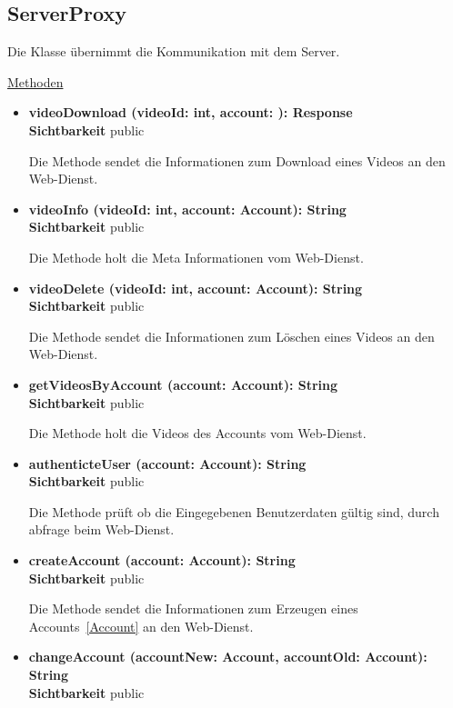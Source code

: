 \newpage
\subsection{ServerProxy}\label{ServerProxy}

Die Klasse übernimmt die Kommunikation mit dem Server.

\underline{Methoden}
\begin{itemize}
\itemsep0pt

\item \textbf{videoDownload (videoId: int, account: ): Response}\hfill\\
\textbf{Sichtbarkeit} public

Die Methode sendet die Informationen zum Download eines Videos an den Web-Dienst.

\item \textbf{videoInfo (videoId: int, account: Account): String}\hfill\\
\textbf{Sichtbarkeit} public

Die Methode holt die Meta Informationen vom Web-Dienst.

\item \textbf{videoDelete (videoId: int, account: Account): String}\hfill\\
\textbf{Sichtbarkeit} public

Die Methode sendet die Informationen zum Löschen eines Videos an den Web-Dienst.

\item \textbf{getVideosByAccount (account: Account): String}\hfill\\
\textbf{Sichtbarkeit} public

Die Methode holt die Videos des Accounts vom Web-Dienst.

\item \textbf{authenticteUser (account: Account): String}\hfill\\
\textbf{Sichtbarkeit} public

Die Methode prüft ob die Eingegebenen Benutzerdaten gültig sind, durch abfrage beim Web-Dienst.

\item \textbf{createAccount (account: Account): String}\hfill\\
\textbf{Sichtbarkeit} public

Die Methode sendet die Informationen zum Erzeugen eines Accounts~\eqref{Account} an den Web-Dienst.

\item \textbf{changeAccount (accountNew: Account, accountOld: Account): String}\hfill\\
\textbf{Sichtbarkeit} public


\end{itemize}
